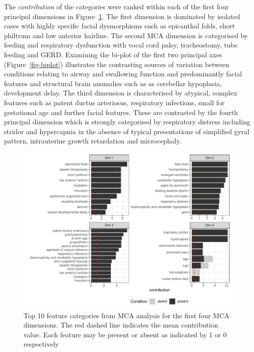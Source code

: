 \documentclass[
  authoryear,
  preprint,
  3p]{elsarticle}
\begin{document}
The \emph{contribution} of the categories were ranked within each of the
first four principal dimensions in Figure~\ref{fig-ctr}. The first
dimension is dominated by isolated cases with highly specific facial
dysmorphisms such as epicanthal folds, short philtrum and low anterior
hairline. The second MCA dimension is categorised by feeding and
respiratory dysfunction with vocal cord palsy, tracheostomy, tube
feeding and GERD. Examining the bi-plot of the first two principal axes
(Figure~\ref{fig-biplot}) illustrates the contrasting sources of
variation between conditions relating to airway and swallowing function
and predominantly facial features and structural brain anomalies such as
as cerebellar hypoplasia, development delay. The third dimension is
characterised by atypical, complex features such as patent ductus
arteriosus, respiratory infections, small for gestational age and
further facial features. These are contrasted by the fourth principal
dimension which is strongly categorised by respiratory distress
including stridor and hypercapnia in the absence of typical
presentations of simplified gyral pattern, intrauterine growth
retardation and microcephaly.

\begin{figure}

{\centering \includegraphics{paper_files/figure-pdf/fig-ctr-1.pdf}

}

\caption{\label{fig-ctr}Top 10 feature categories from MCA analysis for
the first four MCA dimensions. The red dashed line indicates the mean
contribution value. Each feature may be present or absent as indicated
by 1 or 0 respectively}

\end{figure}
\end{document}
